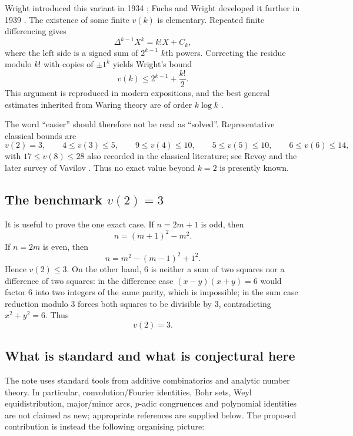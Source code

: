 \documentclass[../Axiomathic.tex]{subfiles}
\begin{document}
Wright introduced this variant in 1934 \cite{Wright1934}; Fuchs and Wright developed it further in 1939 \cite{FuchsWright1939}.  The existence of some finite $v(k)$ is elementary.  Repeated finite differencing gives
\[
  \Delta^{k-1}X^k=k!X+C_k,
\]
where the left side is a signed sum of $2^{k-1}$ $k$th powers.  Correcting the residue modulo $k!$ with copies of $\pm1^k$ yields Wright's bound
\begin{equation}\label{eq:wright-elementary}
  v(k)\le 2^{k-1}+\frac{k!}{2}.
\end{equation}
This argument is reproduced in modern expositions, and the best general estimates inherited from Waring theory are of order $k\log k$ \cite{Borwein2002,Vavilov2022}.

The word ``easier'' should therefore not be read as ``solved''.  Representative classical bounds are
\begin{equation}\label{eq:known-small}
  v(2)=3,\qquad
  4\le v(3)\le5,\qquad
  9\le v(4)\le10,\qquad
  5\le v(5)\le10,\qquad
  6\le v(6)\le14,
\end{equation}
with $17\le v(8)\le28$ also recorded in the classical literature; see Revoy \cite{Revoy1991} and the later survey of Vavilov \cite{Vavilov2022}.  Thus no exact value beyond $k=2$ is presently known.

\subsection{The benchmark $v(2)=3$}

It is useful to prove the one exact case.  If $n=2m+1$ is odd, then
\[
  n=(m+1)^2-m^2.
\]
If $n=2m$ is even, then
\[
  n=m^2-(m-1)^2+1^2.
\]
Hence $v(2)\le3$.  On the other hand, $6$ is neither a sum of two squares nor a difference of two squares: in the difference case $(x-y)(x+y)=6$ would factor $6$ into two integers of the same parity, which is impossible; in the sum case reduction modulo $3$ forces both squares to be divisible by $3$, contradicting $x^2+y^2=6$.  Thus
\[
  \boxed{v(2)=3.}
\]

\subsection{What is standard and what is conjectural here}

The note uses standard tools from additive combinatorics and analytic number theory.  In particular, convolution/Fourier identities, Bohr sets, Weyl equidistribution, major/minor arcs, $p$-adic congruences and polynomial identities are not claimed as new; appropriate references are supplied below.  The proposed contribution is instead the following organising picture:
\begin{center}
\end{center}
\end{document}
